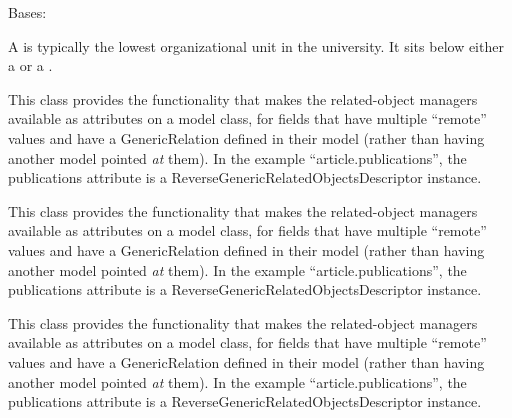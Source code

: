 \documentclass[letterpaper,10pt,english]{sphinxmanual}
\begin{document}
\begin{fulllineitems}
\label{generated/apps.profiles.models:apps.profiles.models.Program}
Bases: {\hyperref[generated/apps.profiles.models:apps.profiles.models.BaseModel]{}}

A  is typically the lowest organizational unit in the university.
It sits below either a  or a .


\begin{fulllineitems}
\label{generated/apps.profiles.models:apps.profiles.models.Program.affiliations}
This class provides the functionality that makes the related-object
managers available as attributes on a model class, for fields that have
multiple ``remote'' values and have a GenericRelation defined in their model
(rather than having another model pointed \emph{at} them). In the example
``article.publications'', the publications attribute is a
ReverseGenericRelatedObjectsDescriptor instance.

\end{fulllineitems}



\begin{fulllineitems}
\label{generated/apps.profiles.models:apps.profiles.models.Program.authorities}
This class provides the functionality that makes the related-object
managers available as attributes on a model class, for fields that have
multiple ``remote'' values and have a GenericRelation defined in their model
(rather than having another model pointed \emph{at} them). In the example
``article.publications'', the publications attribute is a
ReverseGenericRelatedObjectsDescriptor instance.

\end{fulllineitems}



\begin{fulllineitems}
\label{generated/apps.profiles.models:apps.profiles.models.Program.unit_permissions}
This class provides the functionality that makes the related-object
managers available as attributes on a model class, for fields that have
multiple ``remote'' values and have a GenericRelation defined in their model
(rather than having another model pointed \emph{at} them). In the example
``article.publications'', the publications attribute is a
ReverseGenericRelatedObjectsDescriptor instance.

\end{fulllineitems}


\end{fulllineitems}
\end{document}
